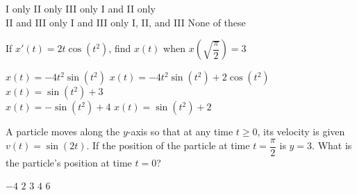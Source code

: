 \begin{questions}
    \begin{oneparchoices}
        \choice I only 
        \choice II only
        \choice III only
        \choice I and II only \\[11pt]
        \makebox[0.035\textwidth]\choice II and III only
        \choice I and III only
        \choice I, II, and III
        \choice None of these
    \end{oneparchoices} \par \horizontalline

    \question If $x'(t) = 2t\cos \left(t^2\right)$, find $x(t)$ when $x\left(\sqrt{\dfrac{\pi}{2}}\right) = 3$ \\

    \begin{oneparchoices}
        \choice $x(t) = -4t^2\sin \left(t^2\right)$
        \choice $x(t) = -4t^2\sin \left(t^2\right) + 2\cos \left(t^2\right)$
        \choice $x(t) = \sin \left(t^2\right) + 3$ \\[11pt]
        \makebox[0.17\textwidth] \choice $x(t) = -\sin \left(t^2\right) + 4$ 
        \makebox[0.2\textwidth] \choice $x(t) = \sin \left(t^2\right) + 2$
    \end{oneparchoices} \par \horizontalline

    \question A particle moves along the $y$-axis so that at any time $t \geq 0$, its velocity is given $v(t) = \sin (2t)$. If the position of the particle at time $t = \dfrac{\pi}{2}$ is $y = 3$. What is the particle's position at time $t = 0$? \\

    \begin{oneparchoices}
        \choice $-4$
        \choice $2$
        \choice $3$
        \choice $4$
        \choice $6$
    \end{oneparchoices} \par \horizontalline
\end{questions}